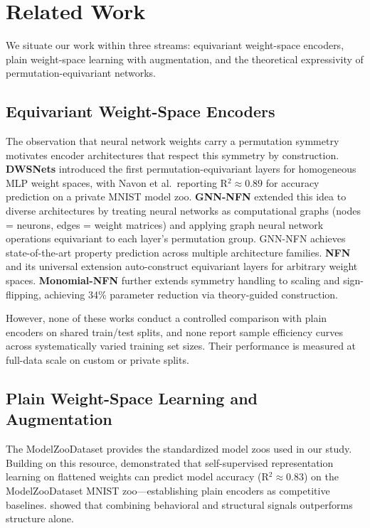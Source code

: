 \section{Related Work}
\label{sec:related}

We situate our work within three streams: equivariant weight-space encoders, plain weight-space learning with augmentation, and the theoretical expressivity of permutation-equivariant networks.

\subsection{Equivariant Weight-Space Encoders}

The observation that neural network weights carry a permutation symmetry motivates encoder architectures that respect this symmetry by construction. \textbf{DWSNets} \cite{Navon2023Equivariant} introduced the first permutation-equivariant layers for homogeneous MLP weight spaces, with Navon et al.\ reporting R$^2{\approx}0.89$ for accuracy prediction on a private MNIST model zoo. \textbf{GNN-NFN} \cite{Kofinas2024Graph} extended this idea to diverse architectures by treating neural networks as computational graphs (nodes = neurons, edges = weight matrices) and applying graph neural network operations equivariant to each layer's permutation group. GNN-NFN achieves state-of-the-art property prediction across multiple architecture families. \textbf{NFN} \cite{Zhou2023Permutation} and its universal extension \cite{Zhou2024Universal} auto-construct equivariant layers for arbitrary weight spaces. \textbf{Monomial-NFN} \cite{Tran2024Monomial} further extends symmetry handling to scaling and sign-flipping, achieving 34\% parameter reduction via theory-guided construction.

However, none of these works conduct a controlled comparison with plain encoders on shared train/test splits, and none report sample efficiency curves across systematically varied training set sizes. Their performance is measured at full-data scale on custom or private splits.

\subsection{Plain Weight-Space Learning and Augmentation}

The ModelZooDataset \cite{Schurholt2022Model} provides the standardized model zoos used in our study. Building on this resource, \citet{Schurholt2021Hyper} demonstrated that self-supervised representation learning on flattened weights can predict model accuracy (R$^2{\approx}0.83$) on the ModelZooDataset MNIST zoo---establishing plain encoders as competitive baselines. \citet{Meynent2025Structure} showed that combining behavioral and structural signals outperforms structure alone.

